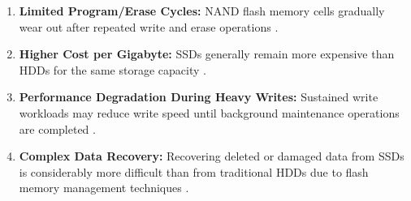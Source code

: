 \begin{enumerate}[label=\roman*.]
    \item \textbf{Limited Program/Erase Cycles:} NAND flash memory cells gradually wear out after repeated write and erase operations \cite{openai2026nvmearchitecture}.
    \item \textbf{Higher Cost per Gigabyte:} SSDs generally remain more expensive than HDDs for the same storage capacity \cite{gfg_storage_structure}.
    \item \textbf{Performance Degradation During Heavy Writes:} Sustained write workloads may reduce write speed until background maintenance operations are completed \cite{openai2026nvmearchitecture}.
    \item \textbf{Complex Data Recovery:} Recovering deleted or damaged data from SSDs is considerably more difficult than from traditional HDDs due to flash memory management techniques \cite{lexar_nvme}.
\end{enumerate}